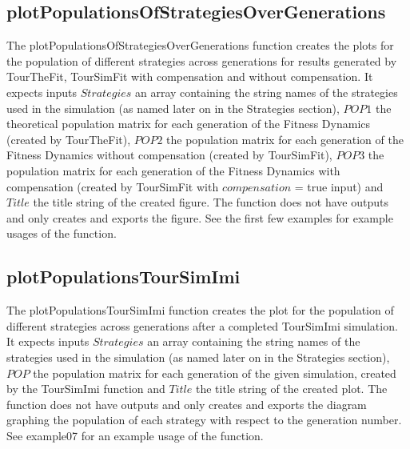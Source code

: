 \documentclass[12pt]{article}
\begin{document}
\subsection{plotPopulationsOfStrategiesOverGenerations}
The plotPopulationsOfStrategiesOverGenerations function creates the plots for the population of different strategies across generations for results generated by TourTheFit, TourSimFit with compensation and without compensation. It expects inputs $Strategies$ an array containing the string names of the strategies used in the simulation (as named later on in the Strategies section), $POP1$ the theoretical population matrix for each generation of the Fitness Dynamics (created by TourTheFit), $POP2$ the population matrix for each generation of the Fitness Dynamics without compensation (created by TourSimFit), $POP3$ the population matrix for each generation of the Fitness Dynamics with compensation (created by TourSimFit with $compensation$ = true input) and $Title$ the title string of the created figure. The function does not have outputs and only creates and exports the figure. See the first few examples for example usages of the function.

\subsection{plotPopulationsTourSimImi}
The plotPopulationsTourSimImi function creates the plot for the population of different strategies across generations after a completed TourSimImi simulation. It expects inputs $Strategies$ an array containing the string names of the strategies used in the simulation (as named later on in the Strategies section), $POP$ the population matrix for each generation of the given simulation, created by the TourSimImi function and $Title$ the title string of the created plot. The function does not have outputs and only creates and exports the diagram graphing the population of each strategy with respect to the generation number. See example07 for an example usage of the function.
\end{document}
